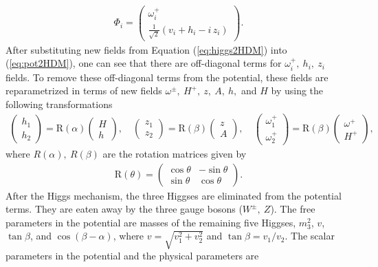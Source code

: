 \begin{align}
\Phi_i=\begin{pmatrix}\omega_i^+\\\frac1{\sqrt2}(v_i+h_i-i\,z_i)
\end{pmatrix}.
\label{eq:higgs2HDM}
\end{align}
After substituting new fields from Equation (\ref{eq:higgs2HDM}) into (\ref{eq:pot2HDM}), 
one can see that there are off-diagonal terms for 
$\omega_i^+, ~ h_i, ~z_i$ fields. To remove these off-diagonal terms from the 
potential, these fields are reparametrized in terms of new fields $\omega^\pm, 
~H^+, ~z, ~A, ~h,$ and $H$ by using the following transformations \cite{PhysRevD.80.015017}
\begin{align}
\begin{pmatrix}h_1\\h_2\end{pmatrix}=\text{R}(\alpha)
\begin{pmatrix}H\\h\end{pmatrix},\quad
\begin{pmatrix}z_1\\z_2\end{pmatrix}=\text{R}(\beta)
\begin{pmatrix}z\\A\end{pmatrix},\quad
\begin{pmatrix}\omega_1^+\\\omega_2^+\end{pmatrix}=\text{R}(\beta)
\begin{pmatrix}\omega^+\\H^+\end{pmatrix},
\end{align}
where $R(\alpha), ~R(\beta)$ are the rotation matrices given by 
\cite{PhysRevD.80.015017}
\begin{align}
\text{R}(\theta)=\begin{pmatrix}\cos\theta&-\sin\theta\\
\sin\theta&\cos\theta\end{pmatrix}.
\end{align}
After the Higgs mechanism, the three Higgses are eliminated from the potential 
terms. They are eaten away by the three gauge bosons ($W^\pm, ~Z$). The free 
parameters in the potential are masses of the remaining five Higgses, $m_3^2$, 
$v$, $\tan\beta$, and $\cos(\beta -\alpha)$, where $v = \sqrt{v_1^2 + v_2^2}$ and 
$\tan\beta = v_1/v_2$. The scalar parameters in the potential and the physical parameters are 
